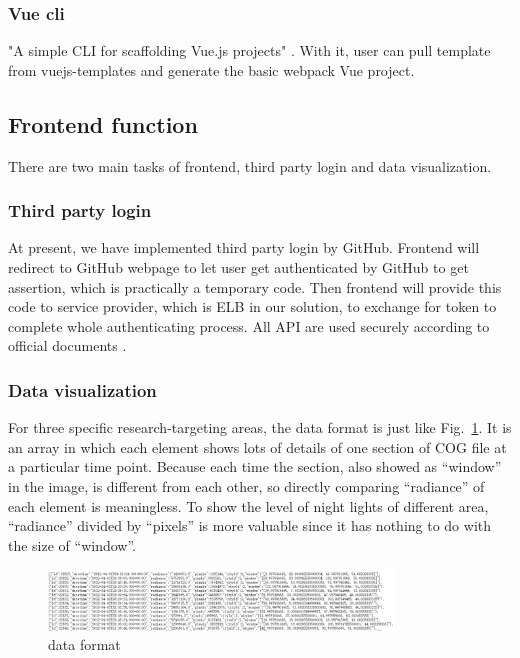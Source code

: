 \documentclass[conference]{IEEEtran}
\begin{document}
\subsubsection{Vue cli}

"A simple CLI for scaffolding Vue.js projects" \cite{Introduc89:online}. With it, user can pull template from vuejs-templates and generate 
the basic webpack \+ Vue project.

\subsection{Frontend function}

There are two main tasks of frontend, third party login and data visualization.

\subsubsection{Third party login}

At present, we have implemented third party login by GitHub. Frontend will redirect to GitHub webpage to let user get authenticated 
by GitHub to get assertion, which is practically a temporary code. Then frontend will provide this code to service provider, which 
is ELB in our solution, to exchange for token to complete whole authenticating process. All API are used securely according to official 
documents \cite{Authoriz26:online}.

\subsubsection{Data visualization}

For three specific research-targeting areas, the data format is just like Fig.~\ref{dffg}. It is an array in which 
each element shows lots of details of one section of COG file at a particular time point. Because each time the section, also showed 
as “window” in the image, is different from each other, so directly comparing “radiance” of each element is meaningless. To show the 
level of night lights of different area, “radiance” divided by “pixels” is more valuable since it has nothing to do with the size of 
“window”.

\begin{figure}[htbp]
    \centerline{\includegraphics[width=260pt]{images/Data_format_frontend_get.png}}
    \caption{data format}
    \label{dffg}
\end{figure}
 
\end{document}
